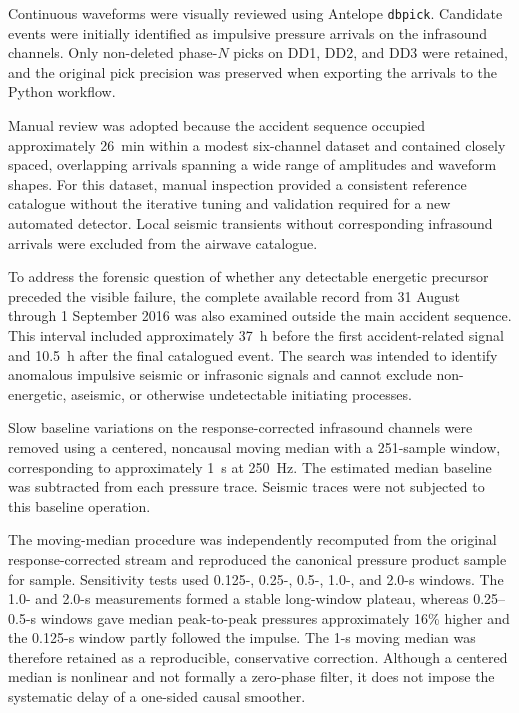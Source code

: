 \documentclass[]{seismica}
\begin{document}
Continuous waveforms were visually reviewed using Antelope \texttt{dbpick}. Candidate events were initially identified as impulsive pressure arrivals on the infrasound channels. Only non-deleted phase-$N$ picks on DD1, DD2, and DD3 were retained, and the original pick precision was preserved when exporting the arrivals to the Python workflow.

Manual review was adopted because the accident sequence occupied approximately 26~min within a modest six-channel dataset and contained closely spaced, overlapping arrivals spanning a wide range of amplitudes and waveform shapes. For this dataset, manual inspection provided a consistent reference catalogue without the iterative tuning and validation required for a new automated detector. Local seismic transients without corresponding infrasound arrivals were excluded from the airwave catalogue.

To address the forensic question of whether any detectable energetic precursor
preceded the visible failure, the complete available record from 31 August
through 1 September 2016 was also examined outside the main accident sequence.
This interval included approximately 37~h before the first accident-related
signal and 10.5~h after the final catalogued event. The search was intended to
identify anomalous impulsive seismic or infrasonic signals and cannot exclude
non-energetic, aseismic, or otherwise undetectable initiating processes.

Slow baseline variations on the response-corrected infrasound channels were removed using a centered, noncausal moving median with a 251-sample window, corresponding to approximately 1~s at 250~Hz. The estimated median baseline was subtracted from each pressure trace. Seismic traces were not subjected to this baseline operation.

The moving-median procedure was independently recomputed from the original
response-corrected stream and reproduced the canonical pressure product sample
for sample. Sensitivity tests used 0.125-, 0.25-, 0.5-, 1.0-, and 2.0-s
windows. The 1.0- and 2.0-s measurements formed a stable long-window plateau,
whereas 0.25--0.5-s windows gave median peak-to-peak pressures approximately
16\% higher and the 0.125-s window partly followed the impulse. The 1-s moving
median was therefore retained as a reproducible, conservative correction.
Although a centered median is nonlinear and not formally a zero-phase filter,
it does not impose the systematic delay of a one-sided causal smoother.
\end{document}
